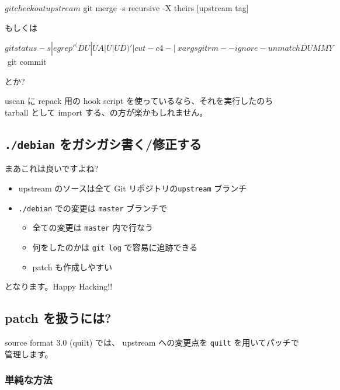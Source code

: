 \documentclass[mingoth,a4paper]{jsarticle}
\begin{document}
\begin{commandline}
$ git checkout upstream
$ git merge -s recursive -X theirs [upstream tag]
\end{commandline}

もしくは

\begin{commandline}
$ git status -s | egrep '^(DU|UA| U|UD)' | cut -c4- | \
    xargs git rm --ignore-unmatch DUMMY$$
$ git commit
\end{commandline}

とか?

uscan に repack 用の hook script を使っているなら、それを実行したのち
tarball として import する、の方が楽かもしれません。


\subsection*{\texttt{./debian} をガシガシ書く/修正する}
\label{sec-3}

まあこれは良いですよね?

\begin{itemize}
\item upstream のソースは全て Git リポジトリの\texttt{upstream} ブランチ
\item \texttt{./debian} での変更は \texttt{master} ブランチで
  \begin{itemize}
  \item 全ての変更は \texttt{master} 内で行なう
  \item 何をしたのかは \texttt{git log} で容易に追跡できる
  \item patch も作成しやすい
  \end{itemize}
\end{itemize}
となります。Happy Hacking!!

\subsection*{patch を扱うには?}

source format 3.0 (quilt) では、
upstream への変更点を {\tt{quilt}} を用いてパッチで管理します。

\label{sec-4}
\subsubsection*{単純な方法}
\label{sec-4-1}
\end{document}
